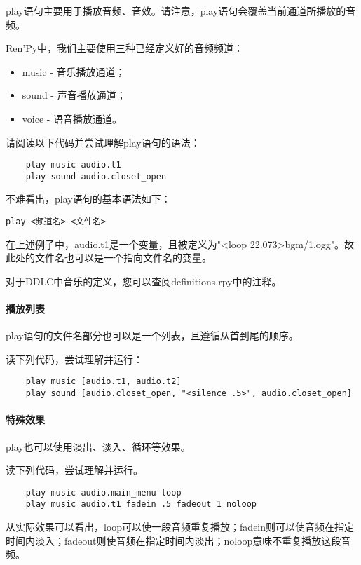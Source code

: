 play语句主要用于播放音频、音效。请注意，play语句会覆盖当前通道所播放的音频。

Ren'Py中，我们主要使用三种已经定义好的音频频道：

\begin{itemize}
    \item music - 音乐播放通道；
    \item sound - 声音播放通道；
    \item voice - 语音播放通道。 
\end{itemize}

请阅读以下代码并尝试理解play语句的语法：

\begin{lstlisting}
    play music audio.t1
    play sound audio.closet_open
\end{lstlisting}

不难看出，play语句的基本语法如下：
\begin{lstlisting}[numbers=none]
play <频道名> <文件名>
\end{lstlisting}

\begin{ExtraKnowledge}
    在上述例子中，audio.t1是一个变量，且被定义为"<loop 22.073>bgm/1.ogg"。故此处的文件名也可以是一个指向文件名的变量。
\end{ExtraKnowledge}

对于DDLC中音乐的定义，您可以查阅definitions.rpy中的注释。

\paragraph{播放列表}
play语句的文件名部分也可以是一个列表，且遵循从首到尾的顺序。

读下列代码，尝试理解并运行：
\begin{lstlisting}
    play music [audio.t1, audio.t2]
    play sound [audio.closet_open, "<silence .5>", audio.closet_open]
\end{lstlisting}


\paragraph{特殊效果}
play也可以使用淡出、淡入、循环等效果。

读下列代码，尝试理解并运行。
\begin{lstlisting}
    play music audio.main_menu loop
    play music audio.t1 fadein .5 fadeout 1 noloop
\end{lstlisting}

从实际效果可以看出，loop可以使一段音频重复播放；fadein则可以使音频在指定时间内淡入；fadeout则使音频在指定时间内淡出；noloop意味不重复播放这段音频。

